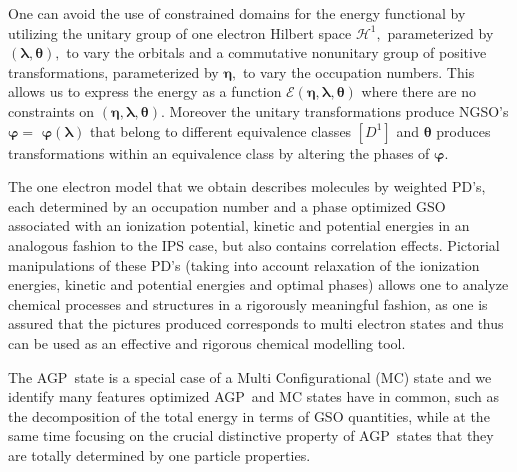 \documentclass[aps,preprint]{revtex4}%
\begin{document}
One can avoid the use of constrained domains for the energy functional by
utilizing the unitary group of one electron Hilbert space $\mathcal{H}^{1},$
parameterized by $\left(  \bm{\lambda},\bm{\theta}\right)  ,$ to vary the
orbitals and a commutative nonunitary group of positive transformations,
parameterized by $\bm{\eta},$ to vary the occupation numbers. This allows us
to express the energy as a function $\mathcal{E}\left(
\bm{\eta },\bm{\lambda},\bm{\theta}\right)  $ where there are no constraints
on $\left(  \bm{\eta},\bm{\lambda},\bm{\theta}\right)  .$ Moreover the unitary
transformations produce NGSO's $\bm{\varphi=}$ $\bm{\varphi}\left(
\bm{\lambda}\right)  $ that belong to different equivalence classes $\left[
D^{1}\right]  $ and $\bm{\theta}$ produces transformations within an
equivalence class by altering the phases of $\bm{\varphi.}$

The one electron model that we obtain describes molecules by weighted PD's,
each determined by an occupation number and a phase optimized GSO associated
with an ionization potential, kinetic and potential energies in an analogous
fashion to the IPS case, but also contains correlation effects. Pictorial
manipulations of these PD's (taking into account relaxation of the ionization
energies, kinetic and potential energies and optimal phases) allows one to
analyze chemical processes and structures in a rigorously meaningful fashion,
as one is assured that the pictures produced corresponds to multi electron
states and thus can be used as an effective and rigorous chemical modelling tool.

The AGP\ state is a special case of a Multi Configurational (MC) state and we
identify many features optimized AGP\ and MC states have in common, such as
the decomposition of the total energy in terms of GSO quantities, while at the
same time focusing on the crucial distinctive property of AGP\ states that
they are totally determined by one particle properties.
\end{document}
